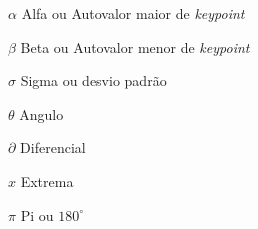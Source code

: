 \begin{simbolos}
  \item[$ \alpha $] Alfa ou Autovalor maior de \textit{keypoint}
  \item[$ \beta $] Beta ou Autovalor menor de \textit{keypoint}
  \item[$ \sigma $] Sigma ou desvio padrão
  \item[$ \theta $] Angulo
  \item[$ \partial $] Diferencial
  \item[$ \hat{x} $] Extrema
  \item[$ \pi $] Pi ou $180^{\circ}$
\end{simbolos}

